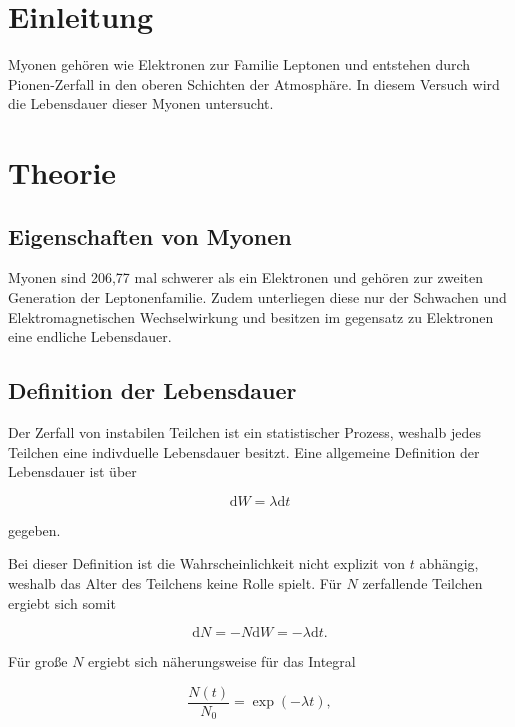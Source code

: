 \section{Einleitung} %
\label{sec:einleitung}

Myonen gehören wie Elektronen zur Familie Leptonen und entstehen durch Pionen-Zerfall in den oberen Schichten der Atmosphäre.
In diesem Versuch wird die Lebensdauer dieser Myonen untersucht.

\section{Theorie} %
\label{sec:theorie}
\FloatBarrier
\subsection{Eigenschaften von Myonen} %
\label{sub:eigenschaften_von_myonen}

Myonen sind 206,77 mal schwerer als ein Elektronen und gehören zur zweiten Generation der Leptonenfamilie.
Zudem unterliegen diese nur der Schwachen und Elektromagnetischen Wechselwirkung und besitzen im gegensatz zu Elektronen eine endliche Lebensdauer.
\FloatBarrier
\subsection{Definition der Lebensdauer} %
\label{sub:definition_der_lebensdauer}

Der Zerfall von instabilen Teilchen ist ein statistischer Prozess, weshalb jedes Teilchen eine indivduelle Lebensdauer besitzt.
Eine allgemeine Definition der Lebensdauer ist über

\begin{equation}
	\text{d}W = \lambda \text{d}t
\end{equation}

gegeben.

Bei dieser Definition ist die Wahrscheinlichkeit nicht explizit von $t$ abhängig, weshalb das Alter des Teilchens keine Rolle spielt.
Für $N$ zerfallende Teilchen ergiebt sich somit

\begin{equation}
	\text{d}N = -N \text{d}W = -\lambda \text{d}t.
\end{equation}

Für große $N$ ergiebt sich näherungsweise für das Integral

\begin{equation}
	\frac{N(t)}{N_\text{0}} = \exp{(-\lambda t)},
\end{equation}

